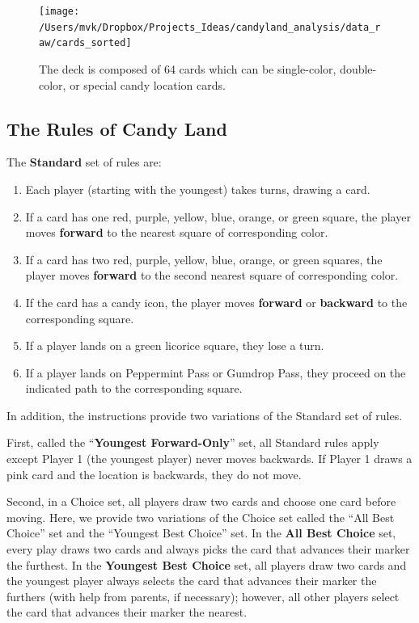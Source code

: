 \documentclass[letterpaper,9pt,twocolumn,twoside,]{pinp}
\providecommand{\tightlist}{%
  \setlength{\itemsep}{0pt}\setlength{\parskip}{0pt}}
\begin{document}
\begin{figure}

{\centering \texttt{[image: /Users/mvk/Dropbox/Projects\_Ideas/candyland\_analysis/data\_raw/cards\_sorted]} 

}

\caption{The deck is composed of 64 cards which can be single-color, double-color, or special candy location cards.}\label{fig:unnamed-chunk-5}
\end{figure}

\hypertarget{the-rules-of-candy-land}{%
\subsection{The Rules of Candy Land}\label{the-rules-of-candy-land}}

The \textbf{Standard} set of rules are:

\begin{enumerate}
\def\labelenumi{\arabic{enumi}.}
\tightlist
\item
  Each player (starting with the youngest) takes turns, drawing a card.
\item
  If a card has one red, purple, yellow, blue, orange, or green square,
  the player moves \textbf{forward} to the nearest square of
  corresponding color.
\item
  If a card has two red, purple, yellow, blue, orange, or green squares,
  the player moves \textbf{forward} to the second nearest square of
  corresponding color.
\item
  If the card has a candy icon, the player moves \textbf{forward} or
  \textbf{backward} to the corresponding square.
\item
  If a player lands on a green licorice square, they lose a turn.
\item
  If a player lands on Peppermint Pass or Gumdrop Pass, they proceed on
  the indicated path to the corresponding square.
\end{enumerate}

In addition, the instructions provide two variations of the Standard set
of rules.

First, called the ``\textbf{Youngest Forward-Only}'' set, all Standard
rules apply except Player 1 (the youngest player) never moves backwards.
If Player 1 draws a pink card and the location is backwards, they do not
move.

Second, in a Choice set, all players draw two cards and choose one card
before moving. Here, we provide two variations of the Choice set called
the ``All Best Choice'' set and the ``Youngest Best Choice'' set. In the
\textbf{All Best Choice} set, every play draws two cards and always
picks the card that advances their marker the furthest. In the
\textbf{Youngest Best Choice} set, all players draw two cards and the
youngest player always selects the card that advances their marker the
furthers (with help from parents, if necessary); however, all other
players select the card that advances their marker the nearest.
\end{document}

